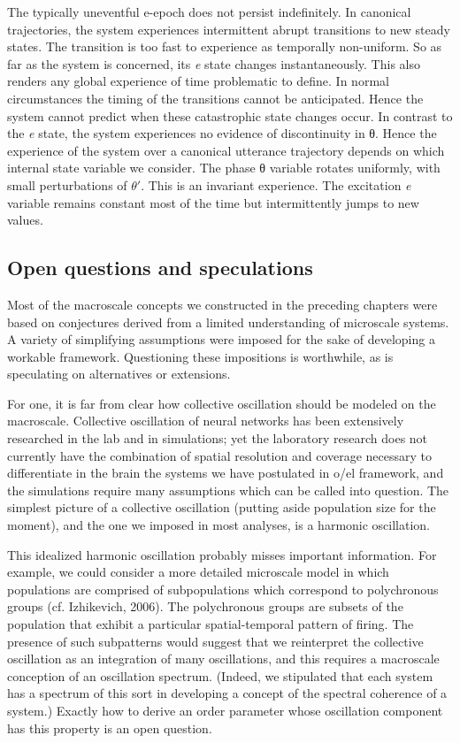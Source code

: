   The typically uneventful e-epoch does not persist indefinitely. In canonical trajectories, the system experiences intermittent abrupt transitions to new steady states. The transition is too fast to experience as temporally non-uniform. So as far as the system is concerned, its \textit{e} state changes instantaneously. This also renders any global experience of time problematic to define. In normal circumstances the timing of the transitions cannot be anticipated. Hence the system cannot predict when these catastrophic state changes occur. In contrast to the \textit{e} state, the system experiences no evidence of discontinuity in θ. Hence the experience of the system over a canonical utterance trajectory depends on which internal state variable we consider. The phase θ variable rotates uniformly, with small perturbations of $\theta ′$. This is an invariant experience. The excitation \textit{e} variable remains constant most of the time but intermittently jumps to new values. 

\subsection{Open questions and speculations}

Most of the macroscale concepts we constructed in the preceding chapters were based on conjectures derived from a limited understanding of microscale systems. A variety of simplifying assumptions were imposed for the sake of developing a workable framework. Questioning these impositions is worthwhile, as is speculating on alternatives or extensions.

  For one, it is far from clear how collective oscillation should be modeled on the macroscale. Collective oscillation of neural networks has been extensively researched in the lab and in simulations; yet the laboratory research does not currently have the combination of spatial resolution and coverage necessary to differentiate in the brain the systems we have postulated in o/el framework, and the simulations require many assumptions which can be called into question. The simplest picture of a collective oscillation (putting aside population size for the moment), and the one we imposed in most analyses, is a harmonic oscillation.

  This idealized harmonic oscillation probably misses important information. For example, we could consider a more detailed microscale model in which populations are comprised of subpopulations which correspond to polychronous groups (cf. Izhikevich, 2006). The polychronous groups are subsets of the population that exhibit a particular spatial-temporal pattern of firing. The presence of such subpatterns would suggest that we reinterpret the collective oscillation as an integration of many oscillations, and this requires a macroscale conception of an oscillation spectrum. (Indeed, we stipulated that each system has a spectrum of this sort in developing a concept of the spectral coherence of a system.) Exactly how to derive an order parameter whose oscillation component has this property is an open question.

